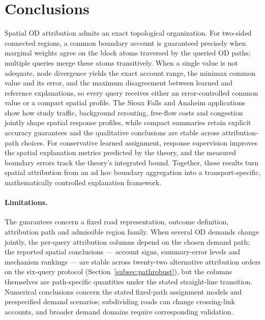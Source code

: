 \documentclass[a4paper,fleqn]{cas-sc}
\begin{document}
\section{Conclusions}\label{sec:conclusions}
Spatial OD attribution admits an exact topological organization. For
two-sided connected regions, a common boundary account is guaranteed
precisely when marginal weights agree on the block atoms traversed by
the queried OD paths; multiple queries merge these atoms transitively.
When a single value is not adequate, node divergence yields the exact
account range, the minimax common value and its error, and the maximum
disagreement between learned and reference explanations, so every query
receives either an error-controlled common value or a compact spatial
profile. The Sioux Falls and Anaheim applications show how study
traffic, background rerouting, free-flow costs and congestion jointly
shape spatial response profiles, while compact summaries retain
explicit accuracy guarantees and the qualitative conclusions are stable
across attribution-path choices. For conservative learned assignment,
response supervision improves the spatial explanation metrics predicted
by the theory, and the measured boundary errors track the theory's
integrated bound. Together, these results turn spatial attribution from
an ad hoc boundary aggregation into a transport-specific,
mathematically controlled explanation framework.

\paragraph{Limitations.}
The guarantees concern a fixed road representation, outcome definition,
attribution path and admissible region family. When several OD demands
change jointly, the per-query attribution columns depend on the chosen
demand path; the reported spatial conclusions --- account signs,
summary-error levels and mechanism rankings --- are stable across
twenty-two alternative attribution orders on the six-query protocol
(Section~\ref{subsec:pathrobust}), but the columns themselves are
path-specific quantities under the stated straight-line transition.
Numerical conclusions concern the stated fixed-path assignment models
and prespecified demand scenarios; subdividing roads can change
crossing-link accounts, and broader demand domains require
corresponding validation.
\end{document}
